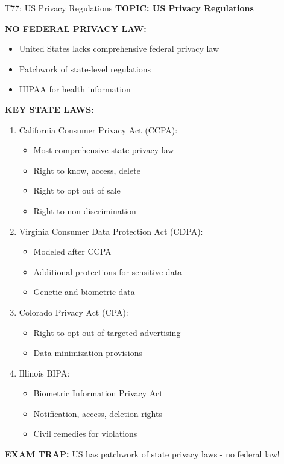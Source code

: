 \documentclass[8pt]{beamer}
\begin{document}
	\begin{frame}{T77: US Privacy Regulations}
		\fontsize{6.5}{7.5}\selectfont
		\textbf{TOPIC: US Privacy Regulations}
		
		\vspace{0.1cm}
		\textbf{NO FEDERAL PRIVACY LAW:}
		\begin{itemize}
			\item United States lacks comprehensive federal privacy law
			\item Patchwork of state-level regulations
			\item HIPAA for health information
		\end{itemize}
		
		\vspace{0.1cm}
		\textbf{KEY STATE LAWS:}
		\begin{enumerate}
			\item \textcolor{myblue}{California Consumer Privacy Act (CCPA):}
			\begin{itemize}
				\item Most comprehensive state privacy law
				\item Right to know, access, delete
				\item Right to opt out of sale
				\item Right to non-discrimination
			\end{itemize}
			\item \textcolor{myblue}{Virginia Consumer Data Protection Act (CDPA):}
			\begin{itemize}
				\item Modeled after CCPA
				\item Additional protections for sensitive data
				\item Genetic and biometric data
			\end{itemize}
			\item \textcolor{myblue}{Colorado Privacy Act (CPA):}
			\begin{itemize}
				\item Right to opt out of targeted advertising
				\item Data minimization provisions
			\end{itemize}
			\item \textcolor{myblue}{Illinois BIPA:}
			\begin{itemize}
				\item Biometric Information Privacy Act
				\item Notification, access, deletion rights
				\item Civil remedies for violations
			\end{itemize}
		\end{enumerate}
		
		\textcolor{myred}{\textbf{EXAM TRAP:}} US has \textcolor{myblue}{patchwork of state privacy laws} - no federal law!
	\end{frame}
	
\end{document}
